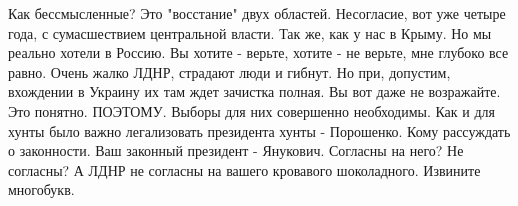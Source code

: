  
 
 
 
 

\begin{cmtfront}
\large{}

Как бессмысленные? Это "восстание" двух областей. Несогласие, вот уже четыре
года, с сумасшествием центральной власти. Так же, как у нас в Крыму. Но мы
реально хотели в Россию. Вы хотите - верьте, хотите - не верьте, мне глубоко
все равно. Очень жалко ЛДНР, страдают люди и гибнут. Но при, допустим,
вхождении в Украину их там ждет зачистка полная. Вы вот даже не возражайте. Это
понятно. ПОЭТОМУ. Выборы для них совершенно необходимы. Как и для хунты было
важно легализовать президента хунты - Порошенко. Кому рассуждать о законности.
Ваш законный президент - Янукович. Согласны на него? Не согласны? А ЛДНР не
согласны на вашего кровавого шоколадного. Извините многобукв.

\end{cmtfront}
